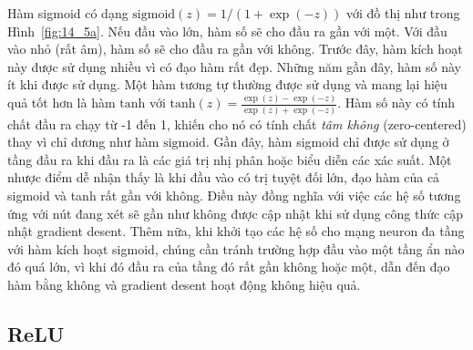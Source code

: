 

 
Hàm sigmoid có dạng $\text{sigmoid}(z) = 1/(1 + \exp(-z))$ với đồ thị như
trong
Hình~\ref{fig:14_5a}. Nếu đầu vào lớn, hàm số sẽ cho đầu ra gần với một. Với đầu
vào nhỏ (rất âm), hàm số sẽ cho đầu ra gần với không. Trước đây, hàm kích hoạt này
được sử dụng nhiều vì có đạo hàm rất đẹp. Những năm gần đây, hàm số
này ít khi được sử dụng. Một hàm tương tự thường được sử dụng và mang lại hiệu
quả tốt hơn là hàm $\text{tanh}$ với $\displaystyle \text{tanh}(z) =
\frac{\exp(z) -
\exp{(-z)}}{\exp(z) + \exp(-z)}$. Hàm số
này có tính chất đầu ra chạy từ -1 đến 1, khiến cho nó có tính chất \textit{tâm không} (zero-centered) thay vì chỉ dương như hàm $\text{sigmoid}$. Gần đây, hàm sigmoid
chỉ được sử dụng ở tầng đầu ra khi đầu ra là các giá trị nhị phân hoặc biểu diễn các xác suất.
Một nhược điểm dễ nhận thấy là khi đầu vào có trị tuyệt đối lớn, đạo hàm của cả sigmoid và tanh rất gần với không. Điều này đồng nghĩa với
việc các hệ số tương ứng với nút đang xét sẽ gần như không được cập nhật khi sử
dụng công thức cập nhật gradient desent. Thêm nữa, khi khởi tạo các hệ số cho
mạng neuron đa tầng với hàm kích hoạt sigmoid, chúng cần tránh trường
hợp đầu vào một tầng ẩn nào đó quá lớn, vì khi đó đầu ra của tầng đó rất gần không hoặc một, dẫn đến đạo hàm bằng không và gradient desent hoạt động
không hiệu quả.


 
 
\subsection{ReLU}
 
